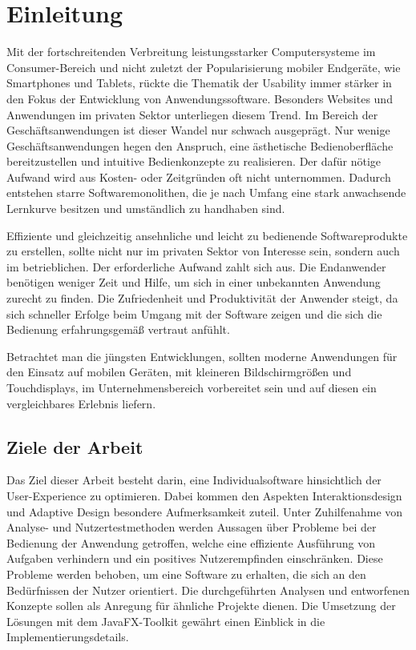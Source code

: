 \chapter{Einleitung}
Mit der fortschreitenden Verbreitung leistungsstarker Computersysteme im Consumer-Bereich und nicht zuletzt der Popularisierung mobiler Endgeräte, wie Smartphones und Tablets, rückte die Thematik der Usability immer stärker in den Fokus der Entwicklung von Anwendungssoftware. Besonders Websites und Anwendungen im privaten Sektor unterliegen diesem Trend. Im Bereich der Geschäftsanwendungen ist dieser Wandel nur schwach ausgeprägt. Nur wenige Geschäftsanwendungen hegen den Anspruch, eine ästhetische Bedienoberfläche bereitzustellen und intuitive Bedienkonzepte zu realisieren. Der dafür nötige Aufwand wird aus Kosten- oder Zeitgründen oft nicht unternommen. Dadurch entstehen starre Softwaremonolithen, die je nach Umfang eine stark anwachsende Lernkurve besitzen und umständlich zu handhaben sind.\par
Effiziente und gleichzeitig ansehnliche und leicht zu bedienende Softwareprodukte zu erstellen, sollte nicht nur im privaten Sektor von Interesse sein, sondern auch im betrieblichen. Der erforderliche Aufwand zahlt sich aus. Die Endanwender benötigen weniger Zeit und Hilfe, um sich in einer unbekannten Anwendung zurecht zu finden. Die Zufriedenheit und Produktivität der Anwender steigt, da sich schneller Erfolge beim Umgang mit der Software zeigen und die sich die Bedienung erfahrungsgemäß vertraut anfühlt.\par
Betrachtet man die jüngsten Entwicklungen, sollten moderne Anwendungen für den Einsatz auf mobilen Geräten, mit kleineren Bildschirmgrößen und Touchdisplays, im Unternehmensbereich vorbereitet sein und auf diesen ein vergleichbares Erlebnis liefern.\par
\section{Ziele der Arbeit} \label{sec:einlZiel}
Das Ziel dieser Arbeit besteht darin, eine Individualsoftware hinsichtlich der User-Experience zu optimieren. Dabei kommen den Aspekten Interaktionsdesign und Adaptive Design besondere Aufmerksamkeit zuteil. Unter Zuhilfenahme von Analyse- und Nutzertestmethoden werden Aussagen über Probleme bei der Bedienung der Anwendung getroffen, welche eine effiziente Ausführung von Aufgaben verhindern und ein positives Nutzerempfinden einschränken. Diese Probleme werden behoben, um eine Software zu erhalten, die sich an den Bedürfnissen der Nutzer orientiert. Die durchgeführten Analysen und entworfenen Konzepte sollen als Anregung für ähnliche Projekte dienen. Die Umsetzung der Lösungen mit dem JavaFX-Toolkit gewährt einen Einblick in die Implementierungsdetails.\par
